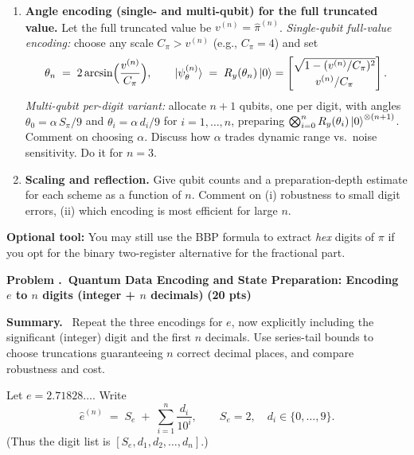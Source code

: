 \documentclass[11pt]{article}
\newcommand{\pts}[1]{\hfill{\small\bfseries(#1 pts)}}
\newenvironment{summary}{\vspace{2pt}\noindent\textbf{Summary.}~}{\par\vspace{6pt}}
\newcounter{problem}
\newcommand{\problem}[2]{%
  \refstepcounter{problem}
  \vspace{10pt}\noindent\textbf{Problem \theproblem.~#1} \pts{#2}\par
}
\begin{document}
\begin{enumerate}[label=(\alph*)]
  \item \textbf{Angle encoding (single- and multi-qubit) for the full truncated value.}
  Let the full truncated value be \(v^{(n)}=\hat{\pi}^{(n)}\).  
  \emph{Single-qubit full-value encoding:} choose any scale \(C_\pi>v^{(n)}\) (e.g., \(C_\pi=4\)) and set
  \[
  \theta_n \;=\; 2\arcsin\!\Big(\frac{v^{(n)}}{C_\pi}\Big),\qquad
  \ket{\psi_\theta^{(n)}} \;=\; R_y(\theta_n)\ket{0}
  = \begin{bmatrix}\sqrt{1-(v^{(n)}/C_\pi)^2}\\[2pt] v^{(n)}/C_\pi\end{bmatrix}.
  \]
  \emph{Multi-qubit per-digit variant:} allocate \(n{+}1\) qubits, one per digit, with angles
  \(\theta_0=\alpha\,S_\pi/9\) and \(\theta_i=\alpha\,d_i/9\) for \(i=1,\dots,n\), preparing
  \(\bigotimes_{i=0}^{n} R_y(\theta_i)\ket{0}^{\otimes(n+1)}\).
  Comment on choosing $\alpha$. Discuss how \(\alpha\) trades dynamic range vs.\ noise sensitivity. Do it for $n=3$.

  \item \textbf{Scaling and reflection.}
  Give qubit counts and a preparation-depth estimate for each scheme as a function of \(n\). Comment on (i) robustness to small digit errors, (ii) which encoding is most efficient for large \(n\).
\end{enumerate}

\noindent\textbf{Optional tool:} You may still use the BBP formula to extract \emph{hex} digits of \(\pi\) if you opt for the binary two-register alternative for the fractional part.


\problem{Quantum Data Encoding and State Preparation: Encoding \(e\) to \(n\) digits (integer + \(n\) decimals)}{20}
\begin{summary}
Repeat the three encodings for \(e\), now explicitly including the significant (integer) digit and the first \(n\) decimals. Use series-tail bounds to choose truncations guaranteeing \(n\) correct decimal places, and compare robustness and cost.
\end{summary}

Let \(e=2.71828\ldots\). Write
\[
\hat e^{(n)} \;=\; S_e \;+\; \sum_{i=1}^{n}\frac{d_i}{10^i},
\qquad S_e=2,\quad d_i\in\{0,\dots,9\}.
\]
(Thus the digit list is \([S_e, d_1, d_2, \dots, d_n]\).)
\end{document}
